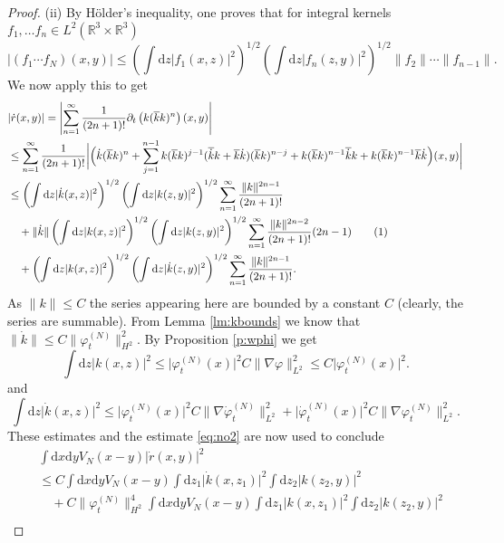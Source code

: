 \documentclass[11pt,a4paper,draft,DIV11]{scrartcl}	%
\newcommand{\di}{\textrm{d}}		%
\newcommand{\cc}[1]{\overline{#1}}	%
\newcommand{\Rbb}{\mathbb{R}}		%
\newcommand{\norm}[1]{\lVert#1\rVert}	%
\newcommand{\ph}{\varphi_t^{(N)}}	%
\newcommand{\phdot}{\dot{\varphi}_t^{(N)}}	%
\newcommand{\bd}{\begin{displaymath}}			%
\newcommand{\ed}{\end{displaymath}}
\newcommand{\tagg}[1]{ \stepcounter{equation} \tag{\theequation} \label{eq:#1} } %
\newcommand{\eqr}[1]{\eqref{eq:#1}}			%
\begin{document}
\begin{proof}
(ii) By H\"older's inequality, one proves that for integral kernels $f_1, \dots f_n \in L^2(\Rbb^3\times\Rbb^3)$
\[
\lvert (f_1 \cdots f_N)(x,y)\rvert \leq \left( \int \di z \lvert f_1(x,z)\rvert^2 \right)^{1/2} \left( \int \di z \lvert f_n(z,y)\rvert^2\right)^{1/2} \norm{f_2} \cdots \norm{f_{n-1}}.
\]
We now apply this to get
\begin{align*}
& \lvert \dot r(x,y) \rvert = \left\lvert \sum_{n=1}^\infty \frac{1}{(2n+1)!} \partial_t \left(k(\cc k k)^n \right)(x,y)\right\rvert \\
& \leq \sum_{n=1}^\infty \frac{1}{(2n+1)!} \bigg\lvert\Big( \dot k(\cc k k)^n + \sum_{j=1}^{n-1} k(\cc k k)^{j-1}(\cc{\dot k}k + \cc k \dot k)(\cc k k)^{n-j} + k (\cc k k)^{n-1} \cc{\dot k} k + k(\cc{k}k)^{n-1}\cc{k}\dot k \Big)(x,y)\bigg\rvert \\
& \leq \left(\int \di z \lvert \dot k(x,z)\rvert^2 \right)^{1/2} \left( \int \di z \lvert k(z,y)\rvert^2 \right)^{1/2} \sum_{n=1}^\infty \frac{\norm{k}^{2n-1}}{(2n+1)!} \\
& \quad + \norm{\dot k} \left( \int \di z \lvert k(x,z)\rvert^2 \right)^{1/2} \left( \int \di z \lvert k(z,y)\rvert^2 \right)^{1/2} \sum_{n=1}^\infty \frac{\norm{k}^{2n-2}}{(2n+1)!} (2n-1) \tagg{no2}\\
& \quad + \left( \int \di z \lvert k(x,z)\rvert^2 \right)^{1/2} \left( \int \di z \lvert \dot k(z,y)\rvert^2 \right)^{1/2} \sum_{n=1}^\infty \frac{\norm{k}^{2n-1}}{(2n+1)!}.
\end{align*}
As $\norm{k} \leq C$ the series appearing here are bounded by a constant $C$ (clearly, the series are summable). From Lemma \ref{lm:kbounds} we know that $\norm{\dot k} \leq C \norm{\ph}_{H^2}^2$. By Proposition \ref{p:wphi} we get
\bd
\int \di z \lvert k(x,z)\rvert^2 \leq \lvert \ph(x)\rvert^2 C \norm{\nabla \varphi}_{L^2}^2 \leq C \lvert \ph(x)\rvert^2.
\ed
and
\bd
\int \di z \lvert \dot k(x,z)\rvert^2 \leq \lvert \ph(x)\rvert^2 C \norm{\nabla \phdot}_{L^2}^2 + \lvert \phdot(x)\rvert^2 C \norm{\nabla \ph}_{L^2}^2.
\ed
These estimates and the estimate \eqr{no2} are now used to conclude
\begin{align*}
& \int \di x \di y V_N(x-y) \lvert \dot r(x,y)\rvert^2 \\
& \leq C \int \di x \di y V_N(x-y) \int \di z_1 \lvert \dot k(x,z_1)\rvert^2 \int \di z_2 \lvert k(z_2,y)\rvert^2 \\
& \quad + C \norm{\ph}_{H^2}^4 \int \di x \di y V_N(x-y) \int \di z_1 \lvert k(x,z_1)\rvert^2 \int \di z_2 \lvert k(z_2,y)\rvert^2 \\

\end{align*}
\end{proof}
\end{document}
